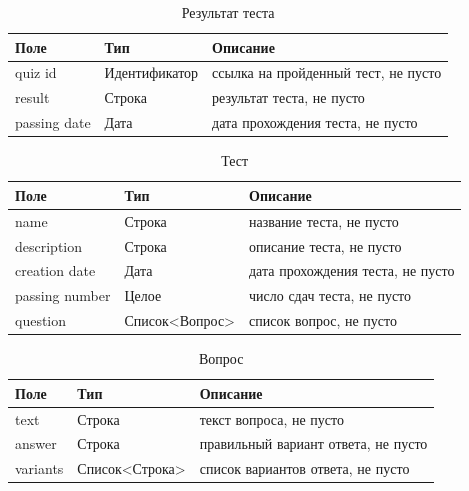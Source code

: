 \begin{table}[ht!]
	\centering
	\caption{Результат теста}
	\label{quizResult:tbl}
	\begin{tabular}{|l|l|l|}
		\hline
		\textbf{Поле} & \textbf{Тип}  & \textbf{Описание}                   \\ \hline
		quiz id       & Идентификатор & ссылка на пройденный тест, не пусто \\ \hline
		result        &  Строка     & результат теста, не пусто           \\ \hline
		passing date  & Дата          & дата прохождения теста, не пусто    \\ \hline
	\end{tabular}
\end{table}

\begin{table}[ht!]
	\centering
	\caption{Тест}
	\label{quiz:tbl}
	\begin{tabular}{|l|l|l|}
		\hline
		\textbf{Поле}  & \textbf{Тип}   & \textbf{Описание}                \\ \hline
		name           &  Строка      & название теста, не пусто         \\ \hline
		description    &  Строка      & описание теста, не пусто         \\ \hline
		creation date  & Дата           & дата прохождения теста, не пусто \\ \hline
		passing number & Целое          & число сдач теста, не пусто       \\ \hline
		question       & Список<Вопрос> & список вопрос, не пусто          \\ \hline
	\end{tabular}
\end{table}

\begin{table}[ht!]
	\centering
	\caption{Вопрос}
	\label{question:tbl}
	\begin{tabular}{|l|l|l|}
		\hline
		\textbf{Поле} & \textbf{Тип}   & \textbf{Описание}                   \\ \hline
		text          &  Строка      & текст вопроса, не пусто             \\ \hline
		answer        &  Строка      & правильный вариант ответа, не пусто \\ \hline
		variants      & Список<Строка> & список вариантов ответа, не пусто   \\ \hline
	\end{tabular}
\end{table}

